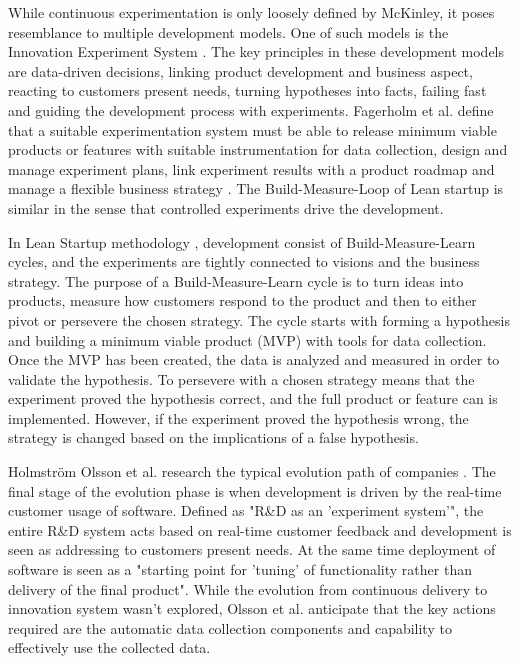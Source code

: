 \documentclass[english]{tktltiki2}
\theoremstyle{definition}
\theoremstyle{remark}
\begin{document}
While continuous experimentation is only loosely defined by McKinley, it poses resemblance to multiple development models. One of such models is the Innovation Experiment System \cite{bosch2012building}. The key principles in these development models are data-driven decisions, linking product development and business aspect, reacting to customers present needs, turning hypotheses into facts, failing fast and guiding the development process with experiments. Fagerholm et al. define that a suitable experimentation system must be able to release minimum viable products or features with suitable instrumentation for data collection, design and manage experiment plans, link experiment results with a product roadmap and manage a flexible business strategy \cite{fagerholm2014building}. The Build-Measure-Loop of Lean startup is similar in the sense that controlled experiments drive the development.

In Lean Startup methodology \cite{ries2011lean}, development consist of Build-Measure-Learn cycles, and the experiments are tightly connected to visions and the business strategy. The purpose of a Build-Measure-Learn cycle is to turn ideas into products, measure how customers respond to the product and then to either pivot or persevere the chosen strategy. The cycle starts with forming a hypothesis and building a minimum viable product (MVP) with tools for data collection. Once the MVP has been created, the data is analyzed and measured in order to validate the hypothesis. To persevere with a chosen strategy means that the experiment proved the hypothesis correct, and the full product or feature can is implemented. However, if the experiment proved the hypothesis wrong, the strategy is changed based on the implications of a false hypothesis.

Holmström Olsson et al. research the typical evolution path of companies \cite{olsson2012climbing}. The final stage of the evolution phase is when development is driven by the real-time customer usage of software. Defined as "R\&D as an 'experiment system'", the entire R\&D system acts based on real-time customer feedback and development is seen as addressing to customers present needs. At the same time deployment of software is seen as a "starting point for 'tuning' of functionality rather than delivery of the final product". While the evolution from continuous delivery to innovation system wasn't explored, Olsson et al. anticipate that the key actions required are the automatic data collection components and capability to effectively use the collected data.
\end{document}
